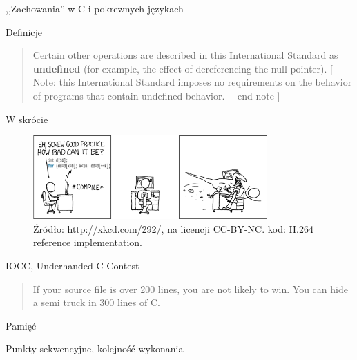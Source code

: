 \begin{frame}{,,Zachowania'' w C i pokrewnych językach}
\begin{block}{Definicje}
\begin{quote}
			Certain other operations are described in this International Standard as  \textbf{undefined} (for example, the effect of dereferencing the null pointer). [ Note: this International Standard imposes no requirements on the behavior of programs that contain undefined behavior. —end note ]
		\end{quote}
	\end{block}
	\begin{block}{W skrócie}
		\begin{figure}[h]
			\includegraphics[width=0.8\textwidth]{gfx/undef_xkcd}
			\caption{Źródło: \url{http://xkcd.com/292/}, na licencji CC-BY-NC. kod: H.264 reference implementation.}
		\end{figure}
	\end{block}
	\begin{block}{IOCC, Underhanded C Contest}
		\begin{quote}
			If your source file is over 200 lines, you are not likely to win. You can hide a semi truck in 300 lines of C.
		\end{quote}
	\end{block}
	\begin{block}{Pamięć}
	\end{block}
	\begin{block}{Punkty sekwencyjne, kolejność wykonania}
\end{block}
\end{frame}
